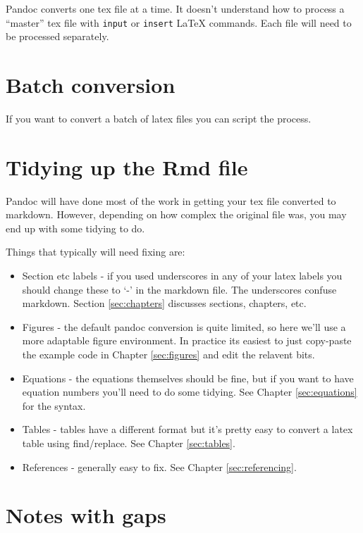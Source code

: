 \documentclass[]{book}
\providecommand{\tightlist}{%
  \setlength{\itemsep}{0pt}\setlength{\parskip}{0pt}}
\begin{document}
Pandoc converts one tex file at a time. It doesn't understand how to process a ``master'' tex file with \texttt{input} or \texttt{insert} LaTeX commands. Each file will need to be processed separately.

\hypertarget{batch-conversion}{%
\section{Batch conversion}\label{batch-conversion}}

If you want to convert a batch of latex files you can script the process.

\hypertarget{tidying}{%
\section{Tidying up the Rmd file}\label{tidying}}

Pandoc will have done most of the work in getting your tex file converted to markdown. However, depending on how complex the original file was, you may end up with some tidying to do.

Things that typically will need fixing are:

\begin{itemize}
\tightlist
\item
  Section etc labels - if you used underscores in any of your latex labels you should change these to `-' in the markdown file. The underscores confuse markdown. Section \ref{sec:chapters} discusses sections, chapters, etc.
\item
  Figures - the default pandoc conversion is quite limited, so here we'll use a more adaptable figure environment. In practice its easiest to just copy-paste the example code in Chapter \ref{sec:figures} and edit the relavent bits.
\item
  Equations - the equations themselves should be fine, but if you want to have equation numbers you'll need to do some tidying. See Chapter \ref{sec:equations} for the syntax.
\item
  Tables - tables have a different format but it's pretty easy to convert a latex table using find/replace. See Chapter \ref{sec:tables}.
\item
  References - generally easy to fix. See Chapter \ref{sec:referencing}.
\end{itemize}

\hypertarget{sec:gaps}{%
\section{Notes with gaps}\label{sec:gaps}}
\end{document}
